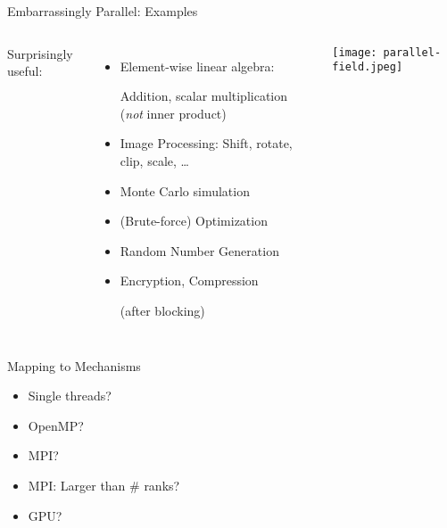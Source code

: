 \documentclass[english,compress]{beamer}
\begin{document}
\begin{frame}{Embarrassingly Parallel: Examples}
  \begin{columns}
      Surprisingly useful:
      \begin{itemize}
        \item Element-wise linear algebra:

          Addition, scalar
          multiplication (\emph{not} inner product)
        \item Image Processing: Shift, rotate, clip, scale, \dots
        \item Monte Carlo simulation
        \item (Brute-force) Optimization
        \item Random Number Generation
        \item Encryption, Compression

          (after blocking)
      \end{itemize}
      \texttt{[image: parallel-field.jpeg]}
  \end{columns}
\end{frame}
\begin{frame}{Mapping to Mechanisms}
  \begin{itemize}[<+->]
    \item Single threads?
    \item OpenMP?
    \item MPI?
    \item MPI: Larger than \# ranks?
    \item GPU?
  \end{itemize}
\end{frame}
\end{document}

